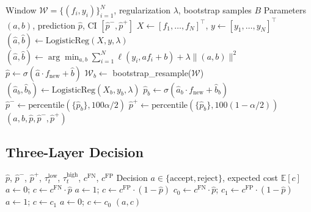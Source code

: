\documentclass[12pt,a4paper]{article}
\begin{document}
\begin{algorithm}[h]
\caption{Platt Calibrator: Fit and Predict with CI}
\label{alg:platt}
\begin{algorithmic}[1]
\Require Window $\mathcal{W} = \{(f_i, y_i)\}_{i=1}^N$, regularization $\lambda$, bootstrap samples $B$
\Ensure Parameters $(a,b)$, prediction $\hat{p}$, CI $[\hat{p}^-,\hat{p}^+]$
\State $X \gets [f_1,\ldots,f_N]^\top$, $y \gets [y_1,\ldots,y_N]^\top$
\State %
\State $(\hat{a}, \hat{b}) \gets \text{LogisticReg}(X, y, \lambda)$
\State $(\hat{a}, \hat{b}) \gets \arg\min_{a,b} \sum_{i=1}^N \ell(y_i, a f_i + b) + \lambda \|(a,b)\|^2$
\State $\hat{p} \gets \sigma(\hat{a} \cdot f_{\text{new}} + \hat{b})$
    \State $\mathcal{W}_b \gets$ bootstrap\_resample($\mathcal{W}$)
    \State $(\hat{a}_b, \hat{b}_b) \gets \text{LogisticReg}(X_b, y_b, \lambda)$
    \State $\hat{p}_b \gets \sigma(\hat{a}_b \cdot f_{\text{new}} + \hat{b}_b)$
\EndFor
\State $\hat{p}^- \gets \text{percentile}(\{\hat{p}_b\}, 100\alpha/2)$
\State $\hat{p}^+ \gets \text{percentile}(\{\hat{p}_b\}, 100(1-\alpha/2))$
\State \Return $(a,b,\hat{p},\hat{p}^-,\hat{p}^+)$
\end{algorithmic}
\end{algorithm}

\subsection{Three-Layer Decision}

\begin{algorithm}[h]
\caption{Three-Layer Decision Rule}
\label{alg:decision}
\begin{algorithmic}[1]
\Require $\hat{p}$, $\hat{p}^-$, $\hat{p}^+$, $\tau^{\text{low}}_t$, $\tau^{\text{high}}_t$, $c^{\text{FN}}$, $c^{\text{FP}}$
\Ensure Decision $a \in \{\text{accept}, \text{reject}\}$, expected cost $\mathbb{E}[c]$
    \State $a \gets 0$; $c \gets c^{\text{FN}} \cdot \hat{p}$ 
    \State $a \gets 1$; $c \gets c^{\text{FP}} \cdot (1-\hat{p})$ 
\Else
    \State $c_0 \gets c^{\text{FN}} \cdot \hat{p}$; $c_1 \gets c^{\text{FP}} \cdot (1-\hat{p})$
        \State $a \gets 1$; $c \gets c_1$
    \Else
        \State $a \gets 0$; $c \gets c_0$
    \EndIf
\EndIf
\State \Return $(a, c)$
\end{algorithmic}
\end{algorithm}
\end{document}
